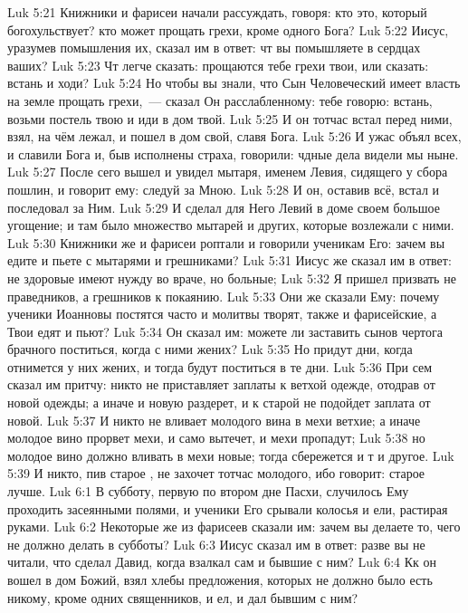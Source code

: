\vs Luk 5:21 Книжники и фарисеи начали рассуждать, говоря: кто это, который богохульствует? кто может прощать грехи, кроме одного Бога?
\vs Luk 5:22 Иисус, уразумев помышления их, сказал им в ответ: чт вы помышляете в сердцах ваших?
\vs Luk 5:23 Чт легче сказать: прощаются тебе грехи твои, или сказать: встань и ходи?
\vs Luk 5:24 Но чтобы вы знали, что Сын Человеческий имеет власть на земле прощать грехи,~--- сказал Он расслабленному: тебе говорю: встань, возьми постель твою и иди в дом твой.
\vs Luk 5:25 И он тотчас встал перед ними, взял, на чём лежал, и пошел в дом свой, славя Бога.
\vs Luk 5:26 И ужас объял всех, и славили Бога и, быв исполнены страха, говорили: чдные дела видели мы ныне.
\rsbpar\vs Luk 5:27 После сего  вышел и увидел мытаря, именем Левия, сидящего у сбора пошлин, и говорит ему: следуй за Мною.
\vs Luk 5:28 И он, оставив всё, встал и последовал за Ним.
\vs Luk 5:29 И сделал для Него Левий в доме своем большое угощение; и там было множество мытарей и других, которые возлежали с ними.
\vs Luk 5:30 Книжники же и фарисеи роптали и говорили ученикам Его: зачем вы едите и пьете с мытарями и грешниками?
\vs Luk 5:31 Иисус же сказал им в ответ: не здоровые имеют нужду во враче, но больные;
\vs Luk 5:32 Я пришел призвать не праведников, а грешников к покаянию.
\vs Luk 5:33 Они же сказали Ему: почему ученики Иоанновы постятся часто и молитвы творят, также и фарисейские, а Твои едят и пьют?
\vs Luk 5:34 Он сказал им: можете ли заставить сынов чертога брачного поститься, когда с ними жених?
\vs Luk 5:35 Но придут дни, когда отнимется у них жених, и тогда будут поститься в те дни.
\vs Luk 5:36 При сем сказал им притчу: никто не приставляет заплаты к ветхой одежде, отодрав от новой одежды; а иначе и новую раздерет, и к старой не подойдет заплата от новой.
\vs Luk 5:37 И никто не вливает молодого вина в мехи ветхие; а иначе молодое вино прорвет мехи, и само вытечет, и мехи пропадут;
\vs Luk 5:38 но молодое вино должно вливать в мехи новые; тогда сбережется и т и другое.
\vs Luk 5:39 И никто, пив старое , не захочет тотчас молодого, ибо говорит: старое лучше.
\vs Luk 6:1 В субботу, первую по втором дне Пасхи, случилось Ему проходить засеянными полями, и ученики Его срывали колосья и ели, растирая руками.
\vs Luk 6:2 Некоторые же из фарисеев сказали им: зачем вы делаете то, чего не должно делать в субботы?
\vs Luk 6:3 Иисус сказал им в ответ: разве вы не читали, что сделал Давид, когда взалкал сам и бывшие с ним?
\vs Luk 6:4 Кк он вошел в дом Божий, взял хлебы предложения, которых не должно было есть никому, кроме одних священников, и ел, и дал бывшим с ним?
